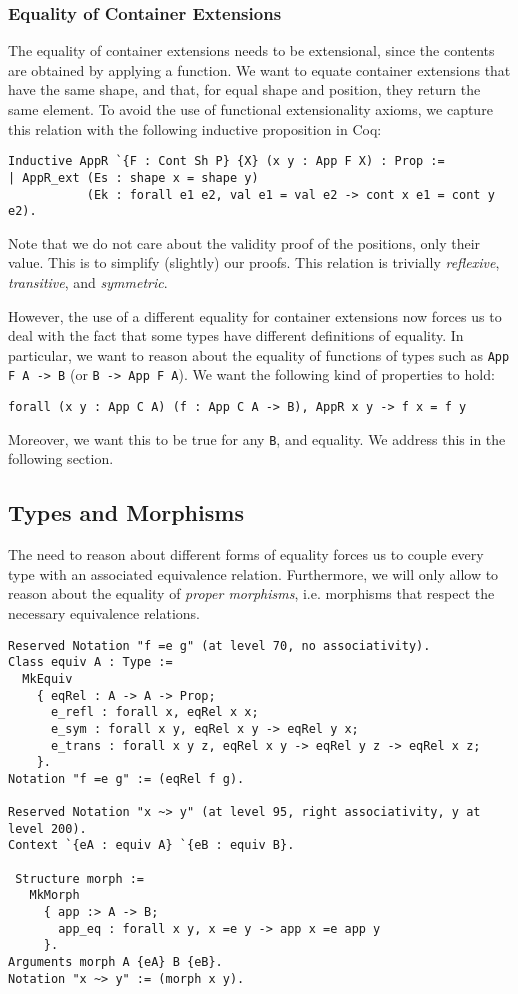 \documentclass[a4paper, UKenglish, cleveref, autoref, thm-restate]{lipics-v2021}
\begin{document}
\subsubsection{Equality of Container Extensions}

The equality of container extensions needs to be extensional, since the
contents are obtained by applying a function. We want to equate container
extensions that have the same shape, and that, for equal shape and position,
they return the same element. To avoid the use of functional extensionality
axioms, we capture this relation with the following inductive proposition in
Coq:
\begin{verbatim}
Inductive AppR `{F : Cont Sh P} {X} (x y : App F X) : Prop :=
| AppR_ext (Es : shape x = shape y)
           (Ek : forall e1 e2, val e1 = val e2 -> cont x e1 = cont y e2).
\end{verbatim}
Note that  we do not care about the validity proof of the positions, only their
value. This is to simplify (slightly) our proofs. This relation is
trivially \emph{reflexive}, \emph{transitive}, and \emph{symmetric}.

However, the use of a different equality for container extensions now forces us
to deal with the fact that some types have different definitions of equality.
In particular, we want to reason about the equality of functions of types such
as \texttt{App F A -> B} (or \texttt{B -> App F A}). 
We want the following kind of properties to hold: 
\begin{verbatim}
forall (x y : App C A) (f : App C A -> B), AppR x y -> f x = f y
\end{verbatim}
Moreover, we want this to be true for any \texttt{B}, and equality.
We address this in the following section.

\subsection{Types and Morphisms}

The need to reason about different forms of equality forces us to couple every
type with an associated equivalence relation. Furthermore, we will only allow
to reason about the equality of \emph{proper morphisms}, i.e. morphisms that
respect the necessary equivalence relations.

\begin{verbatim}
Reserved Notation "f =e g" (at level 70, no associativity).
Class equiv A : Type :=
  MkEquiv
    { eqRel : A -> A -> Prop;
      e_refl : forall x, eqRel x x;
      e_sym : forall x y, eqRel x y -> eqRel y x;
      e_trans : forall x y z, eqRel x y -> eqRel y z -> eqRel x z;
    }.
Notation "f =e g" := (eqRel f g).

Reserved Notation "x ~> y" (at level 95, right associativity, y at level 200).
Context `{eA : equiv A} `{eB : equiv B}.

 Structure morph :=
   MkMorph
     { app :> A -> B;
       app_eq : forall x y, x =e y -> app x =e app y
     }.
Arguments morph A {eA} B {eB}.
Notation "x ~> y" := (morph x y).
\end{verbatim}
\end{document}
